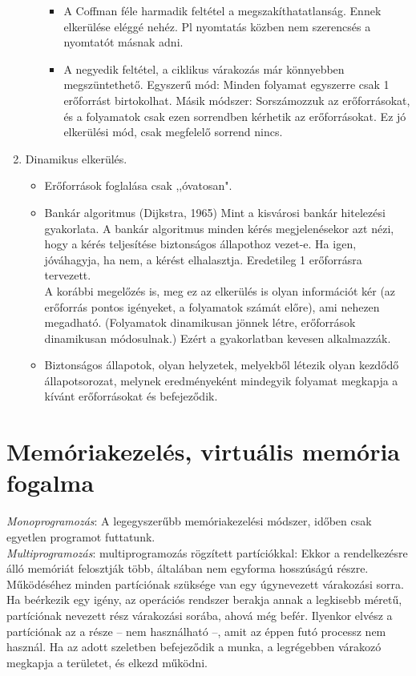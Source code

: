 \documentclass[margin=0px]{article}
\begin{document}
\begin{enumerate}
\begin{itemize}
\begin{itemize}
				\item A Coffman féle harmadik feltétel a megszakíthatatlanság. Ennek elkerülése eléggé
				nehéz. Pl nyomtatás közben nem szerencsés a nyomtatót másnak adni.
				\item A negyedik feltétel, a ciklikus várakozás már könnyebben megszüntethető. Egyszerű mód: Minden folyamat egyszerre csak 1 erőforrást birtokolhat. Másik módszer: Sorszámozzuk az erőforrásokat, és a folyamatok csak ezen sorrendben kérhetik az erőforrásokat. Ez jó elkerülési mód, csak megfelelő sorrend nincs.
			\end{itemize}
		\end{itemize}
		\item Dinamikus elkerülés.
		\begin{itemize}
			\item Erőforrások foglalása csak ,,óvatosan".
			\item Bankár algoritmus (Dijkstra, 1965) Mint a kisvárosi bankár hitelezési gyakorlata. A bankár algoritmus minden kérés megjelenésekor azt nézi, hogy a kérés teljesítése biztonságos
			állapothoz vezet-e. Ha igen, jóváhagyja, ha nem, a kérést elhalasztja. Eredetileg 1 erőforrásra tervezett. \\
			A korábbi megelőzés is, meg ez az elkerülés is olyan információt kér (az erőforrás pontos igényeket, a folyamatok számát előre), ami nehezen megadható. (Folyamatok dinamikusan jönnek létre, erőforrások dinamikusan módosulnak.) Ezért a gyakorlatban kevesen alkalmazzák.
			\item Biztonságos állapotok, olyan helyzetek, melyekből létezik olyan kezdődő állapotsorozat, melynek eredményeként mindegyik folyamat megkapja a kívánt erőforrásokat és befejeződik.
		\end{itemize}
	\end{enumerate}
	
	\section{Memóriakezelés, virtuális memória fogalma}
	
	\textit{Monoprogramozás}: A legegyszerűbb memóriakezelési módszer, időben csak egyetlen programot futtatunk. \\
	\textit{Multiprogramozás}: multiprogramozás rögzített partíciókkal: Ekkor a rendelkezésre álló memóriát felosztják több, általában nem egyforma hosszúságú részre. Működéséhez minden partíciónak szüksége van egy úgynevezett várakozási sorra. Ha beérkezik egy igény, az operációs rendszer berakja annak a legkisebb méretű, partíciónak nevezett rész várakozási sorába, ahová még befér. Ilyenkor elvész a partíciónak az a része – nem használható –, amit az éppen futó processz nem használ. Ha az adott szeletben befejeződik a munka, a legrégebben várakozó megkapja a területet, és elkezd működni.
	
\end{document}

